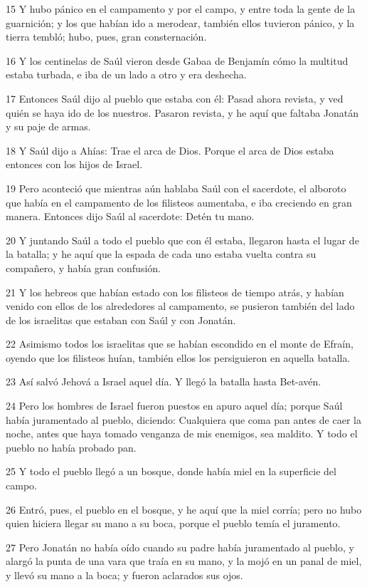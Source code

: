 \par 15 Y hubo pánico en el campamento y por el campo, y entre toda la gente de la guarnición; y los que habían ido a merodear, también ellos tuvieron pánico, y la tierra tembló; hubo, pues, gran consternación.
\par 16 Y los centinelas de Saúl vieron desde Gabaa de Benjamín cómo la multitud estaba turbada, e iba de un lado a otro y era deshecha.
\par 17 Entonces Saúl dijo al pueblo que estaba con él: Pasad ahora revista, y ved quién se haya ido de los nuestros. Pasaron revista, y he aquí que faltaba Jonatán y su paje de armas.
\par 18 Y Saúl dijo a Ahías: Trae el arca de Dios. Porque el arca de Dios estaba entonces con los hijos de Israel.
\par 19 Pero aconteció que mientras aún hablaba Saúl con el sacerdote, el alboroto que había en el campamento de los filisteos aumentaba, e iba creciendo en gran manera. Entonces dijo Saúl al sacerdote: Detén tu mano.
\par 20 Y juntando Saúl a todo el pueblo que con él estaba, llegaron hasta el lugar de la batalla; y he aquí que la espada de cada uno estaba vuelta contra su compañero, y había gran confusión.
\par 21 Y los hebreos que habían estado con los filisteos de tiempo atrás, y habían venido con ellos de los alrededores al campamento, se pusieron también del lado de los israelitas que estaban con Saúl y con Jonatán.
\par 22 Asimismo todos los israelitas que se habían escondido en el monte de Efraín, oyendo que los filisteos huían, también ellos los persiguieron en aquella batalla.
\par 23 Así salvó Jehová a Israel aquel día. Y llegó la batalla hasta Bet-avén.
\par 24 Pero los hombres de Israel fueron puestos en apuro aquel día; porque Saúl había juramentado al pueblo, diciendo: Cualquiera que coma pan antes de caer la noche, antes que haya tomado venganza de mis enemigos, sea maldito. Y todo el pueblo no había probado pan.
\par 25 Y todo el pueblo llegó a un bosque, donde había miel en la superficie del campo.
\par 26 Entró, pues, el pueblo en el bosque, y he aquí que la miel corría; pero no hubo quien hiciera llegar su mano a su boca, porque el pueblo temía el juramento.
\par 27 Pero Jonatán no había oído cuando su padre había juramentado al pueblo, y alargó la punta de una vara que traía en su mano, y la mojó en un panal de miel, y llevó su mano a la boca; y fueron aclarados sus ojos.
